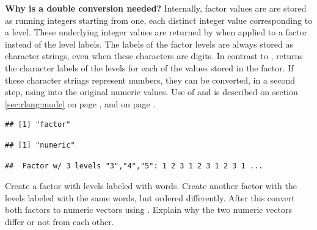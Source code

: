 \documentclass[krantz2]{krantz}\usepackage{knitr}
\begin{document}
\begin{explainbox}
\textbf{Why is a double conversion needed?} Internally, factor values are  are stored as running integers starting from one, each distinct integer value corresponding to a level. These underlying integer values are returned by  when applied to a factor instead of the level labels. The labels of the factor levels are always stored as character strings, even when these characters are digits. In contrast to ,  returns the character labels of the levels for each of the values stored in the factor. If these character strings represent numbers, they can be converted, in a second step, using  into the original numeric values. Use of  and  is described on section \ref{sec:rlang:mode} on page \pageref{sec:rlang:mode}, and  on page \pageref{par:calc:str}.

\begin{knitrout}\footnotesize
{}\color{fgcolor}\begin{kframe}
\begin{alltt}
\end{alltt}
\begin{verbatim}
## [1] "factor"
\end{verbatim}
\begin{alltt}
\end{alltt}
\begin{verbatim}
## [1] "numeric"
\end{verbatim}
\begin{alltt}
\end{alltt}
\begin{verbatim}
##  Factor w/ 3 levels "3","4","5": 1 2 3 1 2 3 1 2 3 1 ...
\end{verbatim}
\end{kframe}
\end{knitrout}

\end{explainbox}

\begin{playground}
Create a factor with levels labeled with words. Create another factor with the levels labeled with the same words, but ordered differently. After this convert both factors to numeric vectors using . Explain why the two numeric vectors differ or not from each other.
\end{playground}
\end{document}
